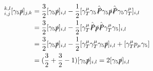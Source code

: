 \begin{enumerate}
	\begin{solution}
	\begin{align}
	[S^2]_{i,j}^{k,l} [\gamma_5 \slashed{p}]_{j,k} &= \frac{3}{2} [\gamma_5 \slashed{p}]_{i,l} 
	     - \frac{1}{2} [\gamma_T^\mu \gamma_5 \hat{\slashed{P}}
	\gamma_5 \slashed{p} \hat{\slashed{P}} \gamma_5  \gamma_T^\mu]_{i,l} \\
	&= \frac{3}{2} [\gamma_5 \slashed{p}]_{i,l} - \frac{1}{2} [\gamma_T^\mu  \hat{\slashed{P}}
	 \slashed{p} \hat{\slashed{P}} \gamma_T^\mu \gamma_5]_{i,l} \\
	&= \frac{3}{2} [\gamma_5 \slashed{p}]_{i,l} - \frac{1}{2} [\gamma_T^\mu  \gamma_T^\mu \gamma_5 \slashed{p}]_{i,l} + [ \gamma_T^\mu p_\mu \gamma_5] \\
	&= (\frac{3}{2} + \frac{3}{2} - 1) [\gamma_5 \slashed{p}]_{i,l}  =  2 [\gamma_5 \slashed{p}]_{i,l}
    \end{align}	
    \end{solution}
	      
	
	
	
\end{enumerate}
